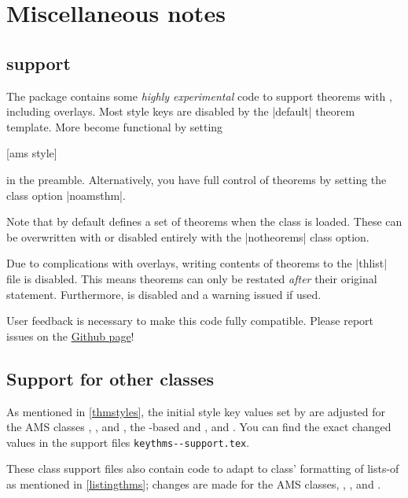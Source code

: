 \documentclass{ltxdoc}
\begin{document}
\section{Miscellaneous notes}

\subsection{ support}

The package contains some \emph{highly experimental} code to support theorems with , including overlays.
Most style keys are disabled by the |default|  theorem template.
More become functional by setting
\begin{dispListing}
[ams style]
\end{dispListing}
in the preamble.
Alternatively, you have full control of theorems by setting the class option |noamsthm|.

Note that by default  defines a set of theorems when the class is loaded.
These can be overwritten with  or disabled entirely with the |notheorems| class option.

Due to complications with overlays, writing contents of theorems to the |thlist| file is disabled. This means theorems can only be restated \emph{after} their original statement. Furthermore,  is disabled and a warning issued if used.

User feedback is necessary to make this code fully compatible. Please report issues on the \href{https://github.com/mbertucci47/keytheorems/issues}{Github page}!

\subsection{Support for other classes}
\label{class-support}

As mentioned in \autoref{thmstyles}, the initial style key values set by  are adjusted for the AMS classes , , and , the -based  and , and . You can find the exact changed values in the support files \texttt{keythms--support.tex}.

These class support files also contain code to adapt to class' formatting of lists-of as mentioned in \autoref{listingthms}; changes are made for the AMS classes, , , and .
\end{document}
